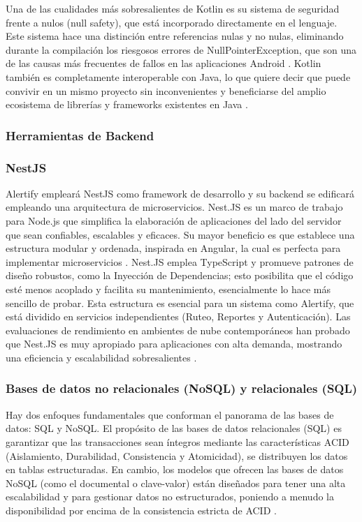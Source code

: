 Una de las cualidades más sobresalientes de Kotlin es su sistema de seguridad frente a nulos (null safety), que está incorporado directamente en el lenguaje. Este sistema hace una distinción entre referencias nulas y no nulas, eliminando durante la compilación los riesgosos errores de NullPointerException, que son una de las causas más frecuentes de fallos en las aplicaciones Android \cite{putranto2020comparative}. Kotlin también es completamente interoperable con Java, lo que quiere decir que puede convivir en un mismo proyecto sin inconvenientes y beneficiarse del amplio ecosistema de librerías y frameworks existentes en Java \cite{moskala2017android}.

\subsubsection{Herramientas de Backend}

\subsubsection{NestJS}
Alertify empleará NestJS como framework de desarrollo y su backend se edificará empleando una arquitectura de microservicios. Nest.JS es un marco de trabajo para Node.js que simplifica la elaboración de aplicaciones del lado del servidor que sean confiables, escalables y eficaces. Su mayor beneficio es que establece una estructura modular y ordenada, inspirada en Angular, la cual es perfecta para implementar microservicios \cite{kesa2021performance}.
Nest.JS emplea TypeScript y promueve patrones de diseño robustos, como la Inyección de Dependencias; esto posibilita que el código esté menos acoplado y facilita su mantenimiento, esencialmente lo hace más sencillo de probar. Esta estructura es esencial para un sistema como Alertify, que está dividido en servicios independientes (Ruteo, Reportes y Autenticación). Las evaluaciones de rendimiento en ambientes de nube contemporáneos han probado que Nest.JS es muy apropiado para aplicaciones con alta demanda, mostrando una eficiencia y escalabilidad sobresalientes \cite{alasmar2025evaluating}. 

\subsubsection{Bases de datos no relacionales (NoSQL) y relacionales (SQL)}
Hay dos enfoques fundamentales que conforman el panorama de las bases de datos: SQL y NoSQL. El propósito de las bases de datos relacionales (SQL) es garantizar que las transacciones sean íntegros mediante las características ACID (Aislamiento, Durabilidad, Consistencia y Atomicidad), se distribuyen los datos en tablas estructuradas. En cambio, los modelos que ofrecen las bases de datos NoSQL (como el documental o clave-valor) están diseñados para tener una alta escalabilidad y para gestionar datos no estructurados, poniendo a menudo la disponibilidad por encima de la consistencia estricta de ACID \cite{meier2019sql}.

